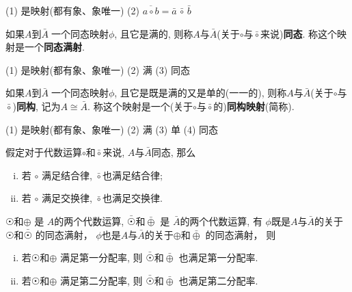 \begin{Note}[同态映射判别]
(1) 是映射(都有象、象唯一) (2) $ \overline{a \circ b} = \bar{a} \,{\bar{\circ}}\, \bar{b}$
\end{Note}

\begin{Definition}[同态满射、同态]
如果$A$到$\bar{A}\;${}\;一个同态映射$\phi$, 且它是满的, 则称$A$与$\bar{A}$\;(关于$\circ$与$\bar{\circ}$来说)\textbf{同态}. 称这个映射是一个\textbf{同态满射}.
\end{Definition}

\begin{Note}[同态满射判别]
(1) 是映射(都有象、象唯一) (2) 满 (3) 同态 
\end{Note}

\begin{Definition}[同构映射、同构]
如果$A$到$\bar{A}\;${}\;一个同态映射$\phi$, 且它是既是满的又是单的(一一的), 则称$A$与$\bar{A}$(关于$\circ$与$\bar{\circ}$)\textbf{同构}, 记为$A \cong
 \bar{A}$. 称这个映射是一个(关于$\circ$与$\bar{\circ}$的)\textbf{同构映射}(简称).
\end{Definition}

\begin{Note}[同构映射判别]
(1) 是映射(都有象、象唯一) (2) 满 (3) 单 (4) 同态
\end{Note}

\begin{Theorem}
假定对于代数运算$\circ$和$\bar{\circ}$来说, $A$与$\bar{A}$同态, 那么
\begin{enumerate}[i)]
\item 若 $\circ$ 满足结合律, $\bar{\circ}$也满足结合律;
\item 若 $\circ$ 满足交换律, $\bar{\circ}$也满足交换律.
\end{enumerate}
\end{Theorem}

\begin{Theorem}
$ \astrosun $和$ \oplus $ 是 $A$的两个代数运算, 
$ \bar{\astrosun} $和$\bar{\oplus} $ 是 $\bar{A}$的两个代数运算,
有
$\phi$既是$A$与$\bar{A}$的关于$ \astrosun $和$\bar{\astrosun}$ 的同态满射，
$\phi$也是$A$与$\bar{A}$的关于$ \oplus $和$\bar{\oplus}$ 的同态满射，
则 
\begin{enumerate}[i)]
\item 若$ \astrosun$和$ \oplus $  满足第一分配率, 则 $ \bar{\astrosun} $和$\bar{\oplus} $ 也满足第一分配率.
\item 若$ \astrosun$和$\oplus $  满足第二分配率, 则 $ \bar{\astrosun} $和$\bar{\oplus} $ 也满足第二分配率.
\end{enumerate}
\end{Theorem}


